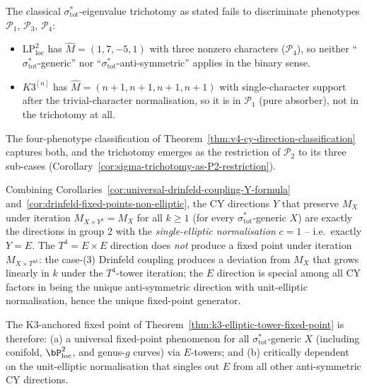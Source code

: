 \begin{remark}
\label{rem:trichotomy-counter-examples}
The classical $\sigma_{\mathrm{tot}}^*$-eigenvalue trichotomy as stated
fails to discriminate phenotypes $\mathcal{P}_1$, $\mathcal{P}_3$,
$\mathcal{P}_4$:
\begin{itemize}
 \item $\mathrm{LP}^2_{\mathrm{loc}}$ has $\hat{M} = (1, 7, -5, 1)$ with
 three nonzero characters \textup{(}$\mathcal{P}_4$\textup{)}, so
 neither ``$\sigma_{\mathrm{tot}}^*$-generic'' nor
 ``$\sigma_{\mathrm{tot}}^*$-anti-symmetric'' applies in the binary
 sense.
 \item $K3^{[n]}$ has $\hat{M} = (n + 1, n + 1, n + 1, n + 1)$ with
 single-character support after the trivial-character normalisation,
 so it is in $\mathcal{P}_1$ \textup{(}pure absorber\textup{)}, not
 in the trichotomy at all.
\end{itemize}
The four-phenotype classification of
Theorem~\ref{thm:v4-cy-direction-classification} captures both, and the
trichotomy emerges as the restriction of $\mathcal{P}_2$ to its three
sub-cases \textup{(}Corollary~\ref{cor:sigma-trichotomy-as-P2-restriction}\textup{).}
\end{remark}

\begin{remark}
\label{rem:which-Y-fixes-M-X-iteration}
Combining Corollaries~\ref{cor:universal-drinfeld-coupling-Y-formula}
and~\ref{cor:drinfeld-fixed-points-non-elliptic}, the CY directions $Y$
that preserve $M_X$ under iteration $M_{X \times Y^k} = M_X$ for all
$k \geq 1$ \textup{(}for every $\sigma_{\mathrm{tot}}^*$-generic
$X$\textup{)} are exactly the directions in group 2 with the
\emph{single-elliptic normalisation} $c = 1$ -- i.e.\ exactly $Y = E$.
The $T^4 = E \times E$ direction does \emph{not} produce a fixed
point under iteration $M_{X \times T^{4k}}$: the case-(3) Drinfeld
coupling produces a deviation from $M_X$ that grows linearly in $k$
under the $T^4$-tower iteration; the $E$ direction is special among
all CY factors in being the unique anti-symmetric direction with
unit-elliptic normalisation, hence the unique fixed-point generator.

The K$3$-anchored fixed point of
Theorem~\ref{thm:k3-elliptic-tower-fixed-point} is therefore:
\textup{(a)} a universal fixed-point phenomenon for all
$\sigma_{\mathrm{tot}}^*$-generic $X$ \textup{(}including conifold,
$\bP^2_{\mathrm{loc}}$, and genus-$g$ curves\textup{)} via $E$-towers;
and \textup{(b)} critically dependent on the unit-elliptic
normalisation that singles out $E$ from all other anti-symmetric CY
directions.
\end{remark}


